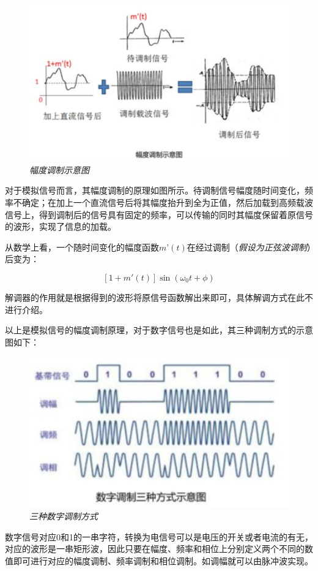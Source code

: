 \begin{multicols}{2}
\begin{figure}[H]
\centering
\includegraphics[width=\linewidth,clip=true,trim=0 45 0 0]{IMG/201909/190907}
\caption{\textit{幅度调制示意图}}
\end{figure}

对于模拟信号而言，其幅度调制的原理如图所示。待调制信号幅度随时间变化，频率不确定；在加上一个直流信号后将其幅度抬升到全为正值，然后加载到高频载波信号上，得到调制后的信号具有固定的频率，可以传输的同时其幅度保留着原信号的波形，实现了信息的加载。

从数学上看，一个随时间变化的幅度函数$m’(t)$在经过调制（\textit{假设为正弦波调制}）后变为：

\[
[1+m'(t)]\sin (\omega_0t+\phi)
\]


解调器的作用就是根据得到的波形将原信号函数解出来即可，具体解调方式在此不进行介绍。

以上是模拟信号的幅度调制原理，对于数字信号也是如此，其三种调制方式的示意图如下：

\begin{figure}[H]
\centering
\includegraphics[width=\linewidth,clip=true,trim=0 45 0 0]{IMG/201909/190909}
\caption{\textit{三种数字调制方式}}
\end{figure}

数字信号对应0和1的一串字符，转换为电信号可以是电压的开关或者电流的有无，对应的波形是一串矩形波，因此只要在幅度、频率和相位上分别定义两个不同的数值即可进行对应的幅度调制、频率调制和相位调制。如调幅就可以由脉冲波实现。

\end{multicols}

\ADxinhangdao


